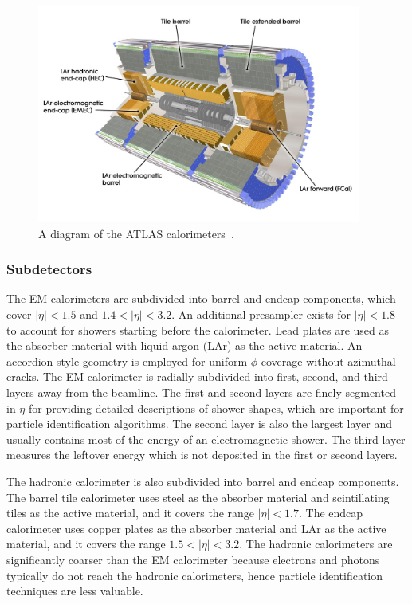 \begin{figure}[tp]
  \centering
  \includegraphics[width=0.95\textwidth]{figures/lhc-atlas/detector-calorimeters}
  \caption{A diagram of the ATLAS calorimeters~\cite{cern-jinst-atlas}.}
  \label{fig:atlas-detector-calorimeters}
\end{figure}

\subsubsection{Subdetectors}

The EM calorimeters are subdivided into barrel and endcap components, which cover $|\eta| < 1.5$ and $1.4 < |\eta| < 3.2$. An additional presampler exists for $|\eta| < 1.8$ to account for showers starting before the calorimeter. Lead plates are used as the absorber material with liquid argon (LAr) as the active material. An accordion-style geometry is employed for uniform $\phi$ coverage without azimuthal cracks. The EM calorimeter is radially subdivided into first, second, and third layers away from the beamline. The first and second layers are finely segmented in $\eta$ for providing detailed descriptions of shower shapes, which are important for particle identification algorithms. The second layer is also the largest layer and usually contains most of the energy of an electromagnetic shower. The third layer measures the leftover energy which is not deposited in the first or second layers. 

The hadronic calorimeter is also subdivided into barrel and endcap components. The barrel tile calorimeter uses steel as the absorber material and scintillating tiles as the active material, and it covers the range $|\eta| < 1.7$. The endcap calorimeter uses copper plates as the absorber material and LAr as the active material, and it covers the range $1.5 < |\eta| < 3.2$. The hadronic calorimeters are significantly coarser than the EM calorimeter because electrons and photons typically do not reach the hadronic calorimeters, hence particle identification techniques are less valuable.

